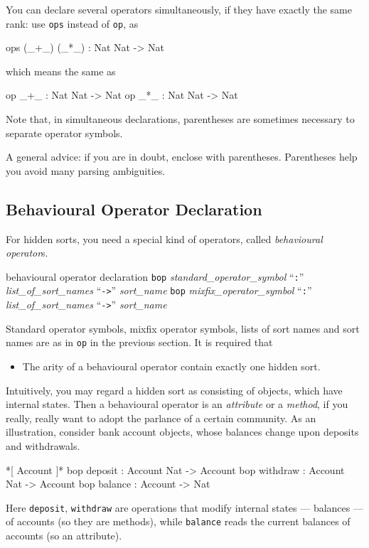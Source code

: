\documentclass[a4paper]{memoir}
\begin{document}
You can declare several operators simultaneously, if they have exactly
the same rank:
use \verb|ops| instead of \verb|op|, as
\begin{vvtm}
\begin{ccode}
  ops (_+_) (_*_) : Nat Nat -> Nat
\end{ccode}
\end{vvtm}
which means the same as
\begin{vvtm}
\begin{ccode}
  op _+_ : Nat Nat -> Nat
  op _*_ : Nat Nat -> Nat
\end{ccode}
\end{vvtm}
Note that, in simultaneous declarations, parentheses are sometimes necessary
to separate operator symbols.

\begin{warning}
  A general advice: if you are in doubt, enclose with parentheses.
  Parentheses help you avoid many parsing ambiguities.
\end{warning}

\subsection{Behavioural Operator Declaration}\label{sec:p2-beh-op-decl}

For hidden sorts, you need a special kind of operators, called
{\em behavioural operator\/}s.

\begin{bsyntax} behavioural operator declaration  \Hline
\texttt{bop} \textit{standard\_operator\_symbol} ``\texttt{:}'' \textit{list\_of\_sort\_names} ``\texttt{->}'' \textit{sort\_name}
\texttt{bop} \textit{mixfix\_operator\_symbol} ``\texttt{:}'' \textit{list\_of\_sort\_names} ``\texttt{->}'' \textit{sort\_name}
\end{bsyntax}

Standard operator symbols, mixfix operator symbols, lists of sort names
and sort names are as in \verb|op| in the previous section.
It is required that
\begin{itemize}
\item The arity of a behavioural operator contain exactly one
  hidden sort.
\end{itemize}
Intuitively, you may regard a hidden sort as consisting of objects, which
have internal states. Then a behavioural operator
is an {\em attribute} or a {\em method},
if you really, really want to adopt the parlance of a certain community.
As an illustration,
consider bank account objects, whose balances change upon deposits and
withdrawals.
\begin{vvtm}
\begin{ccode}
  *[ Account ]*
  bop deposit : Account Nat -> Account
  bop withdraw : Account Nat -> Account
  bop balance : Account -> Nat
\end{ccode}
\end{vvtm}
Here \verb|deposit|, \verb|withdraw| are operations that modify
internal states --- balances --- of accounts (so they are methods),
while \verb|balance| reads the current balances of accounts
(so an attribute).
\end{document}
